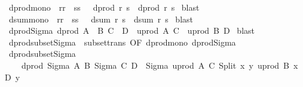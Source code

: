 \begin{isabellebody}
\isanewline
\isanewline
\isanewline
\isanewline
{}\isamarkupfalse%
\ dprod{\isacharunderscore}mono{\isacharcolon}\ {\isachardoublequoteopen}{\isacharbrackleft}{\isacharbar}\ r{\isacharless}{\isacharequal}r{\isacharprime}{\isacharsemicolon}\ \ s{\isacharless}{\isacharequal}s{\isacharprime}\ {\isacharbar}{\isacharbrackright}\ {\isacharequal}{\isacharequal}{\isachargreater}\ dprod\ r\ s\ {\isacharless}{\isacharequal}\ dprod\ r{\isacharprime}\ s{\isacharprime}{\isachardoublequoteclose}\isanewline
%
\isadelimproof
%
\endisadelimproof
%
\isatagproof
{}\isamarkupfalse%
\ blast%
\endisatagproof
{\isafoldproof}%
%
\isadelimproof
\isanewline
%
\endisadelimproof
\isanewline
{}\isamarkupfalse%
\ dsum{\isacharunderscore}mono{\isacharcolon}\ {\isachardoublequoteopen}{\isacharbrackleft}{\isacharbar}\ r{\isacharless}{\isacharequal}r{\isacharprime}{\isacharsemicolon}\ \ s{\isacharless}{\isacharequal}s{\isacharprime}\ {\isacharbar}{\isacharbrackright}\ {\isacharequal}{\isacharequal}{\isachargreater}\ dsum\ r\ s\ {\isacharless}{\isacharequal}\ dsum\ r{\isacharprime}\ s{\isacharprime}{\isachardoublequoteclose}\isanewline
%
\isadelimproof
%
\endisadelimproof
%
\isatagproof
{}\isamarkupfalse%
\ blast%
\endisatagproof
{\isafoldproof}%
%
\isadelimproof
\isanewline
%
\endisadelimproof
\isanewline
\isanewline
\isanewline
\isanewline
{}\isamarkupfalse%
\ dprod{\isacharunderscore}Sigma{\isacharcolon}\ {\isachardoublequoteopen}{\isacharparenleft}dprod\ {\isacharparenleft}A\ {\isasymtimes}\ B{\isacharparenright}\ {\isacharparenleft}C\ {\isasymtimes}\ D{\isacharparenright}{\isacharparenright}\ {\isacharless}{\isacharequal}\ {\isacharparenleft}uprod\ A\ C{\isacharparenright}\ {\isasymtimes}\ {\isacharparenleft}uprod\ B\ D{\isacharparenright}{\isachardoublequoteclose}\isanewline
%
\isadelimproof
%
\endisadelimproof
%
\isatagproof
{}\isamarkupfalse%
\ blast%
\endisatagproof
{\isafoldproof}%
%
\isadelimproof
\isanewline
%
\endisadelimproof
\isanewline
{}\isamarkupfalse%
\ dprod{\isacharunderscore}subset{\isacharunderscore}Sigma\ {\isacharequal}\ subset{\isacharunderscore}trans\ {\isacharbrackleft}OF\ dprod{\isacharunderscore}mono\ dprod{\isacharunderscore}Sigma{\isacharbrackright}\isanewline
\isanewline
\isanewline
{}\isamarkupfalse%
\ dprod{\isacharunderscore}subset{\isacharunderscore}Sigma{}{\isacharcolon}\isanewline
\ \ \ \ {\isachardoublequoteopen}{\isacharparenleft}dprod\ {\isacharparenleft}Sigma\ A\ B{\isacharparenright}\ {\isacharparenleft}Sigma\ C\ D{\isacharparenright}{\isacharparenright}\ {\isacharless}{\isacharequal}\ Sigma\ {\isacharparenleft}uprod\ A\ C{\isacharparenright}\ {\isacharparenleft}Split\ {\isacharparenleft}{\isacharpercent}x\ y{\isachardot}\ uprod\ {\isacharparenleft}B\ x{\isacharparenright}\ {\isacharparenleft}D\ y{\isacharparenright}{\isacharparenright}{\isacharparenright}{\isachardoublequoteclose}\isanewline

\end{isabellebody}
